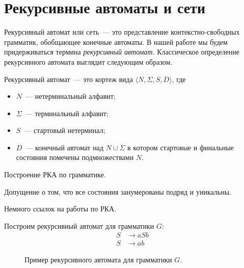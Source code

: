 \section{Рекурсивные автоматы и сети}

Рекурсивный автомат или сеть~--- это представление контекстно-свободных грамматик, обобщающее конечные автоматы.
В нашей работе мы будем придерживаться термина \emph{рекурсивный автомат}.
Классическое определение рекурсивного автомата выглядит следующим образом.

\begin{definition}
    Рекурсивный автомат~--- это кортеж вида $\langle N, \Sigma, S, D \rangle$, где
    \begin{itemize}
        \item $N$~--- нетерминальный алфавит;
        \item $\Sigma$~--- терминальный алфавит;
        \item $S$~--- стартовый нетерминал;
        \item $D$~--- конечный автомат над $N \cup \Sigma$ в котором стартовые и финальные состояния помечены подмножествами $N$.
    \end{itemize}
\end{definition}

Построение РКА по грамматике.

Допущение о том, что все состояния занумерованы подряд и уникальны.

Немного ссылок на работы по РКА.

Построим рекурсивный автомат для грамматики $G$:
\begin{align*}
    S & \to    a S b \\
    S & \to    a b
\end{align*}

\begin{figure}
    \caption{Пример рекурсивного автомата для грамматики $G$.}
    \label{input1}
\end{figure}


